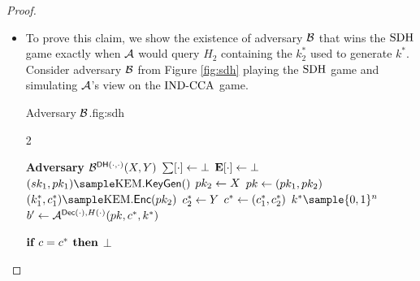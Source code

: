 \documentclass{article}
\begin{document}
\begin{proof}
\begin{itemize}
                                                \[ \gamedifference{1}{2} \leq Pr[\abort_1] = \advantage{\nominalgroup, \adversary{B}}{\sdh}. \]

                                            \item[\emph{Proof}]
                                                To prove this claim, we show the existence of adversary $\mathcal{B}$ that wins the $\text{SDH}$ game exactly when $\mathcal{A}$ would query $H_2$ containing the $k^*_2$ used to generate $k^*$.
                                                Consider adversary $\mathcal{B}$ from Figure \ref{fig:sdh} playing the $\text{SDH}$ game and simulating $\mathcal{A}$'s view on the $\text{IND-CCA}$ game.

                                                \begin{gamefigure}{Adversary $\mathcal{B}$.}{fig:sdh}
                                                    \begin{games}{2}
                                                        \begin{gameenv}{\textbf{Adversary} $\mathcal{B}^{\textsf{DH}(\cdot, \cdot)}(X, Y)$}
                                                            \State $\sum[\cdot] \leftarrow \bot$
                                                            \State $\mathbf{E}[\cdot] \leftarrow \bot$
                                                            \State $(\sk_1, \pk_1) \sample \kem.\keygen()$
                                                            \State $pk_2 \leftarrow X$
                                                            \State $pk \leftarrow (pk_1, pk_2)$
                                                            \State $(k^*_1, c^*_1) \sample \kem.\enc(\pk_2)$
                                                            \State $c^*_2 \leftarrow Y$
                                                            \State $c^* \leftarrow (c^*_1, c^*_2)$
                                                            \State $k^* \sample \bits^{n}$
                                                            \State $b' \leftarrow \mathcal{A}^{\textsf{Dec}(\cdot), H(\cdot)}(pk, c^*, k^*)$
                                                        \end{gameenv}
                                                        \gamebreak
                                                        \begin{gameenv}{\oracledec}
                                                            \State $\textbf{if } c = c^* \textbf{ then}$
                                                                \State \quad \Return $\bot$

\end{gameenv}
\end{games}
\end{gamefigure}
\end{itemize}
\end{proof}
\end{document}
